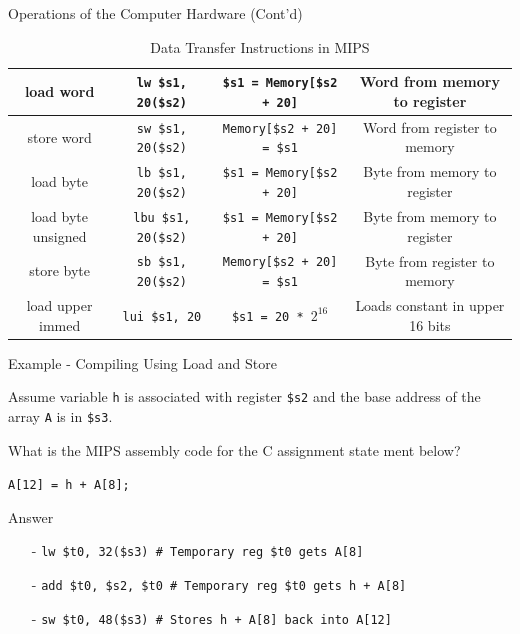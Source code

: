 \begin{frame}{Operations of the Computer Hardware (Cont'd)}
\begin{table}[H]
\begin{adjustbox}{width=\textwidth}
\begin{tabular}{|c|c|c|c|}
\hline
load word & \texttt{lw \$s1, 20(\$s2)} & \texttt{\$s1 = Memory[\$s2 + 20]} & Word from memory to register \\
\hline
store word & \texttt{sw \$s1, 20(\$s2)} & \texttt{Memory[\$s2 + 20] = \$s1} & Word from register to memory \\
\hline
load byte & \texttt{lb \$s1, 20(\$s2)} & \texttt{\$s1 = Memory[\$s2 + 20]} & Byte from memory to register \\
\hline
load byte unsigned & \texttt{lbu \$s1, 20(\$s2)} & \texttt{\$s1 = Memory[\$s2 + 20]} & Byte from memory to register \\
\hline
store byte & \texttt{sb \$s1, 20(\$s2)} & \texttt{Memory[\$s2 + 20] = \$s1} & Byte from register to memory \\
\hline
load upper immed & \texttt{lui \$s1, 20} & \texttt{\$s1 = 20 * $2^{16}$} & Loads constant in upper 16 bits \\
\hline
\end{tabular}
\end{adjustbox}
\caption{Data Transfer Instructions in MIPS}
\end{table}
\end{frame}

\begin{frame}{Example - Compiling Using Load and Store}
\begin{flushleft}
Assume variable \texttt{h} is associated with register \texttt{\$s2} and the base address of the array \texttt{A} is in \texttt{\$s3}. 

What is the MIPS assembly code for the C assignment state­
ment below?

\hspace{8mm}\texttt{A[12] = h + A[8];}
\end{flushleft}
\end{frame}

\begin{frame}{Answer}
\begin{itemize}
\item[-]
\texttt{lw \$t0, 32(\$s3) \# Temporary reg \$t0 gets A[8]}

\item[-]
\texttt{add \$t0, \$s2, \$t0  \# Temporary reg \$t0 gets h + A[8]}

\item[-]
\texttt{sw \$t0, 48(\$s3)  \# Stores h + A[8] back into A[12]}
\end{itemize}    
\end{frame}

